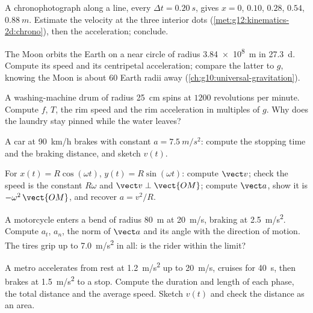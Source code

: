 \begin{exercise}[$\star\star$]\label{exo:g12:kinematics-2d:8}
A chronophotograph along a line, every $\Delta t = \qty{0.20}{s}$,
gives $x = 0$, $0.10$, $0.28$, $0.54$, $\qty{0.88}{m}$. Estimate the
velocity at the three interior dots
(\cref{met:g12:kinematics-2d:chrono}), then the acceleration; conclude.
\end{exercise}

\begin{exercise}[$\star\star$]\label{exo:g12:kinematics-2d:9}
The Moon orbits the Earth on a near circle of radius \qty{3.84e8}{m}
in \qty{27.3}{d}. Compute its speed and its centripetal acceleration;
compare the latter to $g$, knowing the Moon is about $60$ Earth radii
away (\cref{ch:g10:universal-gravitation}).
\end{exercise}

\begin{exercise}[$\star\star$]\label{exo:g12:kinematics-2d:10}
A washing-machine drum of radius \qty{25}{cm} spins at $1200$
revolutions per minute. Compute $f$, $T$, the rim speed and the rim
acceleration in multiples of $g$. Why does the laundry stay pinned
while the water leaves?
\end{exercise}

\begin{exercise}[$\star\star$]\label{exo:g12:kinematics-2d:11}
A car at \qty{90}{km/h} brakes with constant $a = \qty{7.5}{m/s^2}$:
compute the stopping time and the braking distance, and sketch $v(t)$.
\end{exercise}

\begin{exercise}[$\star\star\star$]\label{exo:g12:kinematics-2d:12}
For $x(t) = R\cos(\omega t)$, $y(t) = R\sin(\omega t)$: compute
$\vect v$; check the speed is the constant $R\omega$ and
$\vect v \perp \vect{OM}$; compute $\vect a$, show it is
$-\omega^2\,\vect{OM}$, and recover $a = v^2/R$.
\end{exercise}

\begin{exercise}[$\star\star\star$]\label{exo:g12:kinematics-2d:13}
A motorcycle enters a bend of radius \qty{80}{m} at \qty{20}{m/s},
braking at \qty{2.5}{m/s^2}. Compute $a_t$, $a_n$, the norm of
$\vect a$ and its angle with the direction of motion. The tires grip
up to \qty{7.0}{m/s^2} in all: is the rider within the limit?
\end{exercise}

\begin{exercise}[$\star\star\star$]\label{exo:g12:kinematics-2d:14}
A metro accelerates from rest at \qty{1.2}{m/s^2} up to \qty{20}{m/s},
cruises for \qty{40}{s}, then brakes at \qty{1.5}{m/s^2} to a stop.
Compute the duration and length of each phase, the total distance and
the average speed. Sketch $v(t)$ and check the distance as an area.
\end{exercise}

